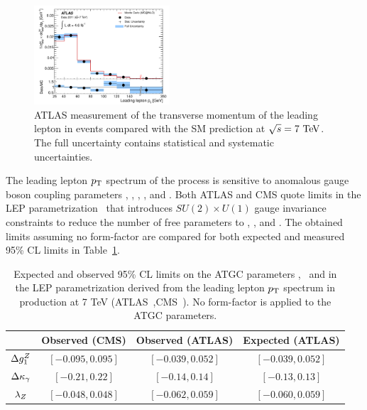 % 
\begin{figure}[htbp]
  \begin{center}
  \includegraphics[width=0.45\textwidth]{figures/sss-inclboson-diboson-wwprod-pt-fiducial.pdf}
  \caption{ATLAS measurement of the transverse momentum of the leading lepton in \WW events compared with the SM prediction at $\rts = 7\TeV$. The full uncertainty contains statistical and systematic uncertainties.}
\label{fig:sss-WWprod-pt-fiducial}
\end{center}
\end{figure}


The leading lepton $p_{\mathrm{T}}$ spectrum of the \WW process is sensitive to anomalous gauge boson coupling parameters
\dkg,  \dkz, \lg, \lz, and \dgz. Both ATLAS and CMS quote limits in the LEP 
parametrization~\cite{Gounaris:1996rz} that introduces $SU(2) \times U(1)$ gauge invariance 
constraints to reduce the number of free parameters to \dgz,  \dkg, and \lz. The obtained limits assuming 
no form-factor are compared for both expected and measured 95\% CL limits in Table~\ref{tab:sss-WZprod-ATGC}.

\begin{table}\centering
\begin{tabular}{cccc}
\hline
& Observed (CMS) & Observed (ATLAS) & Expected (ATLAS)\\
\hline
$\Delta g_1^Z$ & $[-0.095, 0.095]$ & $[-0.039, 0.052]$ & $[-0.039, 0.052]$ \\
$\Delta \kappa_\gamma$ & $[-0.21, 0.22]$ & $[-0.14, 0.14 ]$ & $[-0.13, 0.13]$ \\
$\lambda_Z$ & $[-0.048, 0.048]$ & $[-0.062, 0.059]$ & $[-0.060, 0.059]$ \\
\hline
\end{tabular}
\caption{Expected and observed 95\% CL limits on the ATGC parameters 
\dkg, \lz\ and \dgz\; in the LEP parametrization derived from the leading lepton $p_{\mathrm{T}}$ spectrum in \WW production at 7 TeV (ATLAS~\cite{ATLAS:2012mec},CMS~\cite{Chatrchyan:2013yaa}). No form-factor is applied to the ATGC parameters.}
\label{tab:sss-WZprod-ATGC}
\end{table}





